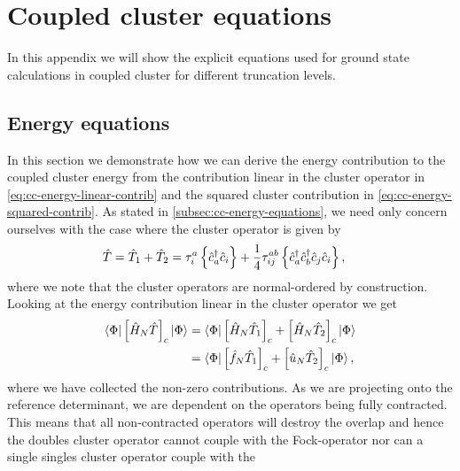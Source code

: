 \chapter{Coupled cluster equations}
    In this appendix we will show the explicit equations used for ground state
    calculations in coupled cluster for different truncation levels.

    \section{Energy equations}
        \label{app:cc-energy-equations}
        In this section we demonstrate how we can derive the energy contribution
        to the coupled cluster energy from the contribution linear in the
        cluster operator in \autoref{eq:cc-energy-linear-contrib} and the squared
        cluster contribution in \autoref{eq:cc-energy-squared-contrib}.
        As stated in \autoref{subsec:cc-energy-equations}, we need only concern
        ourselves with the case where the cluster operator is given by
        \begin{align}
            \hat{T}
            &= \hat{T}_1 + \hat{T}_2
            = \tau^{a}_{i}\left\{ \hat{c}_{a}^{\dagger}\hat{c}_{i} \right\}
            + \frac{1}{4}\tau^{ab}_{ij}\left\{ \hat{c}_{a}^{\dagger}\hat{c}_{b}^{\dagger}\hat{c}_{j}\hat{c}_{i} \right\},
        \end{align}
        where we note that the cluster operators are normal-ordered by
        construction.
        Looking at the energy contribution linear in the cluster operator we get
        \begin{align}
            \bra{\Phi}\left[ 
                \hat{H}_N
                \hat{T}
             \right]_c\ket{\Phi}
            &=
            \bra{\Phi}\left[ 
                \hat{H}_N
                \hat{T}_1
             \right]_c
            + \left[ 
                \hat{H}_N
                \hat{T}_2
             \right]_c\ket{\Phi}
            \\
            &=
            \bra{\Phi}\left[ 
                \hat{f}_N
                \hat{T}_1
             \right]_c
            + \left[ 
                \hat{u}_N
                \hat{T}_2
             \right]_c\ket{\Phi},
        \end{align}
        where we have collected the non-zero contributions.
        As we are projecting onto the reference determinant, we are dependent on
        the operators being fully contracted.
        This means that all non-contracted operators will destroy the overlap
        and hence the doubles cluster operator cannot couple with the
        Fock-operator nor can a single singles cluster operator couple with the
